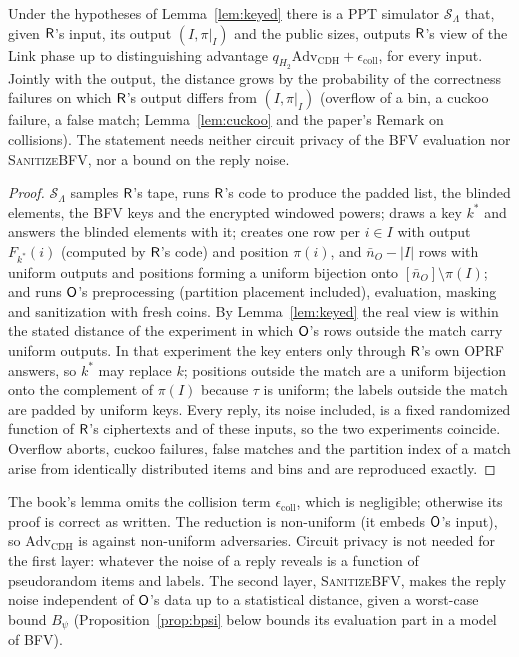 \begin{theorem}\label{thm:G4}
Under the hypotheses of Lemma~\ref{lem:keyed} there is a PPT simulator $\mathcal S_\Lambda$ that, given $\mathsf{R}$'s input, its output $(I,\pi|_I)$ and the public sizes, outputs $\mathsf{R}$'s view of the Link phase up to distinguishing advantage $q_{H_2}\mathrm{Adv}_{\mathrm{CDH}}+\epsilon_{\mathrm{coll}}$, for every input. Jointly with the output, the distance grows by the probability of the correctness failures on which $\mathsf{R}$'s output differs from $(I,\pi|_I)$ (overflow of a bin, a cuckoo failure, a false match; Lemma~\ref{lem:cuckoo} and the paper's Remark on collisions). The statement needs neither circuit privacy of the BFV evaluation nor \textsc{SanitizeBFV}, nor a bound on the reply noise.
\end{theorem}
\begin{proof}
$\mathcal S_\Lambda$ samples $\mathsf{R}$'s tape, runs $\mathsf{R}$'s code to produce the padded list, the blinded elements, the BFV keys and the encrypted windowed powers; draws a key $k^\ast$ and answers the blinded elements with it; creates one row per $i\in I$ with output $F_{k^\ast}(i)$ (computed by $\mathsf{R}$'s code) and position $\pi(i)$, and $\bar n_O-|I|$ rows with uniform outputs and positions forming a uniform bijection onto $[\bar n_O]\setminus\pi(I)$; and runs $\mathsf{O}$'s preprocessing (partition placement included), evaluation, masking and sanitization with fresh coins. By Lemma~\ref{lem:keyed} the real view is within the stated distance of the experiment in which $\mathsf{O}$'s rows outside the match carry uniform outputs. In that experiment the key enters only through $\mathsf{R}$'s own OPRF answers, so $k^\ast$ may replace $k$; positions outside the match are a uniform bijection onto the complement of $\pi(I)$ because $\tau$ is uniform; the labels outside the match are padded by uniform keys. Every reply, its noise included, is a fixed randomized function of $\mathsf{R}$'s ciphertexts and of these inputs, so the two experiments coincide. Overflow aborts, cuckoo failures, false matches and the partition index of a match arise from identically distributed items and bins and are reproduced exactly.
\end{proof}

\begin{remark}
The book's lemma omits the collision term $\epsilon_{\mathrm{coll}}$, which is negligible; otherwise its proof is correct as written. The reduction is non-uniform (it embeds $\mathsf{O}$'s input), so $\mathrm{Adv}_{\mathrm{CDH}}$ is against non-uniform adversaries. Circuit privacy is not needed for the first layer: whatever the noise of a reply reveals is a function of pseudorandom items and labels. The second layer, \textsc{SanitizeBFV}, makes the reply noise independent of $\mathsf{O}$'s data up to a statistical distance, given a worst-case bound $B_\psi$ (Proposition~\ref{prop:bpsi} below bounds its evaluation part in a model of BFV).
\end{remark}

